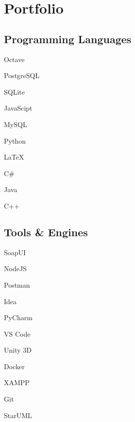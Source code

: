 \separator

\section{Portfolio}
\reducespace
\begin{multicols}{2}\raggedcolumns%
	\subsection{Programming Languages}
	\reducespace
	\begin{multicols}{3}\raggedcolumns%
		\begin{cvlist}
			\item Octave%
			\item PostgreSQL%
			\item SQLite%
			\item JavaScipt%
			\item MySQL%
			\item Python%
			\item \LaTeX%
			\item C\#%
			\item Java%
			\item C++%
		\end{cvlist}
	\end{multicols}
	
	\subsection{Tools \& Engines}
	\reducespace
	\begin{multicols}{3}\raggedcolumns%
		\begin{cvlist}
			\item SoapUI
			\item NodeJS
			\item Postman
			\item Idea
			\item PyCharm
			\item VS Code
			\item Unity 3D
			\item Docker
			\item XAMPP
			\item Git
			\item StarUML
		\end{cvlist}
	\end{multicols}


\end{multicols}
